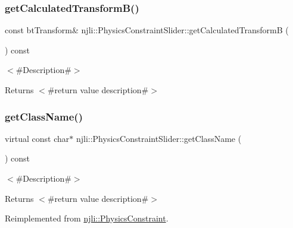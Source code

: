 \subsubsection{\texorpdfstring{get\+Calculated\+Transform\+B()}{getCalculatedTransformB()}}
{\footnotesize\ttfamily const bt\+Transform\& njli\+::\+Physics\+Constraint\+Slider\+::get\+Calculated\+TransformB (\begin{DoxyParamCaption}{ }\end{DoxyParamCaption}) const}

$<$\#\+Description\#$>$

\begin{DoxyReturn}{Returns}
$<$\#return value description\#$>$ 
\end{DoxyReturn}
\mbox{\label{classnjli_1_1_physics_constraint_slider_a6258ffd852a364064bfddb19669293c2}} 
\subsubsection{\texorpdfstring{get\+Class\+Name()}{getClassName()}}
{\footnotesize\ttfamily virtual const char$\ast$ njli\+::\+Physics\+Constraint\+Slider\+::get\+Class\+Name (\begin{DoxyParamCaption}{ }\end{DoxyParamCaption}) const\hspace{0.3cm}{\ttfamily [virtual]}}

$<$\#\+Description\#$>$

\begin{DoxyReturn}{Returns}
$<$\#return value description\#$>$ 
\end{DoxyReturn}


Reimplemented from \mbox{\hyperlink{classnjli_1_1_physics_constraint_a4d31c5267199972942d66b3480374010}{njli\+::\+Physics\+Constraint}}.

\mbox{\label{classnjli_1_1_physics_constraint_slider_a0de9fb59fa29e7e1766c6e0e02ef37e3}} 
